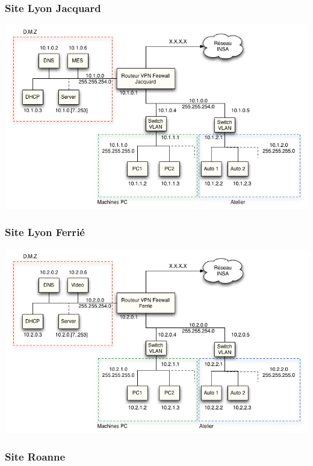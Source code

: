 \documentclass[a4paper]{article}
\begin{document}
\subsubsection{Site Lyon Jacquard}

\begin{center}
\includegraphics[scale=0.6]{SiteJacquard.png}
\end{center}

\subsubsection{Site Lyon Ferrié}

\begin{center}
\includegraphics[scale=0.6]{SiteFerrie.png}
\end{center}

\subsubsection{Site Roanne}
\end{document}
